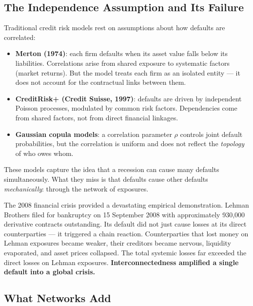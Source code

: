 \documentclass[11pt, a4paper]{article}
\theoremstyle{definition}
\theoremstyle{plain}
\theoremstyle{remark}
\begin{document}
\subsection{The Independence Assumption and Its Failure}

Traditional credit risk models rest on assumptions about how defaults are correlated:

\begin{itemize}
    \item \textbf{Merton (1974)}: each firm defaults when its asset value falls below
          its liabilities.
          Correlations arise from shared exposure to systematic factors (market returns).
          But the model treats each firm as an isolated entity --- it does not account
          for the contractual links between them.
    \item \textbf{CreditRisk+ (Credit Suisse, 1997)}: defaults are driven by
          independent Poisson processes, modulated by common risk factors.
          Dependencies come from shared factors, not from direct financial linkages.
    \item \textbf{Gaussian copula models}: a correlation parameter $\rho$ controls
          joint default probabilities, but the correlation is uniform and does not
          reflect the \emph{topology} of who owes whom.
\end{itemize}

These models capture the idea that a recession can cause many defaults simultaneously.
What they miss is that defaults cause other defaults \emph{mechanically}: through the
network of exposures.

\begin{warningbox}
The 2008 financial crisis provided a devastating empirical demonstration.
Lehman Brothers filed for bankruptcy on 15 September 2008 with approximately
930{,}000 derivative contracts outstanding.
Its default did not just cause losses at its direct counterparties --- it triggered
a chain reaction.
Counterparties that lost money on Lehman exposures became weaker, their creditors
became nervous, liquidity evaporated, and asset prices collapsed.
The total systemic losses far exceeded the direct losses on Lehman exposures.
\textbf{Interconnectedness amplified a single default into a global crisis.}
\end{warningbox}

\subsection{What Networks Add}
\end{document}
